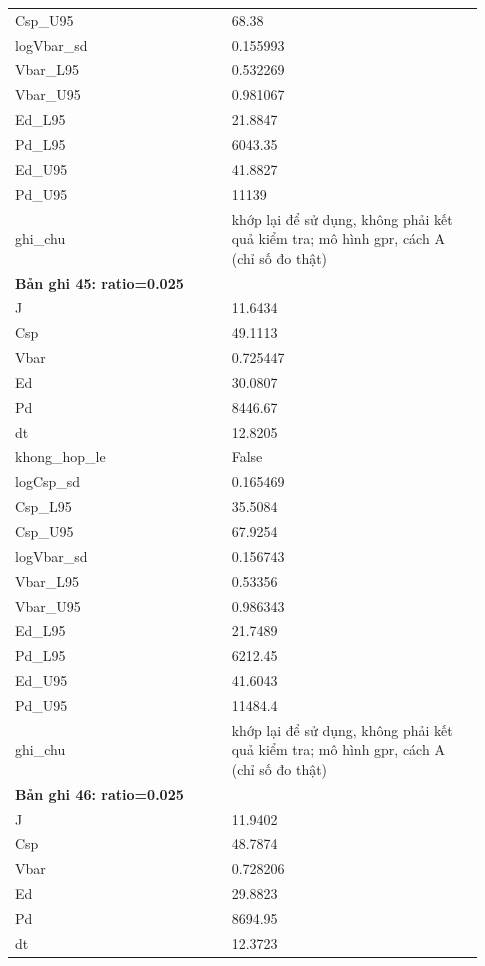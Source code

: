 \begin{longtable}{p{0.43\linewidth}p{0.50\linewidth}}
Csp\_\allowbreak U95 & 68.38 \\
logVbar\_\allowbreak sd & 0.155993 \\
Vbar\_\allowbreak L95 & 0.532269 \\
Vbar\_\allowbreak U95 & 0.981067 \\
Ed\_\allowbreak L95 & 21.8847 \\
Pd\_\allowbreak L95 & 6043.35 \\
Ed\_\allowbreak U95 & 41.8827 \\
Pd\_\allowbreak U95 & 11139 \\
ghi\_\allowbreak chu & khớp lại để sử dụng, không phải kết quả kiểm tra; mô hình gpr, cách A (chỉ số đo thật) \\
\midrule
\multicolumn{2}{p{0.95\linewidth}}{\textbf{Bản ghi 45: ratio=0.025}} \\
J & 11.6434 \\
Csp & 49.1113 \\
Vbar & 0.725447 \\
Ed & 30.0807 \\
Pd & 8446.67 \\
dt & 12.8205 \\
khong\_\allowbreak hop\_\allowbreak le & False \\
logCsp\_\allowbreak sd & 0.165469 \\
Csp\_\allowbreak L95 & 35.5084 \\
Csp\_\allowbreak U95 & 67.9254 \\
logVbar\_\allowbreak sd & 0.156743 \\
Vbar\_\allowbreak L95 & 0.53356 \\
Vbar\_\allowbreak U95 & 0.986343 \\
Ed\_\allowbreak L95 & 21.7489 \\
Pd\_\allowbreak L95 & 6212.45 \\
Ed\_\allowbreak U95 & 41.6043 \\
Pd\_\allowbreak U95 & 11484.4 \\
ghi\_\allowbreak chu & khớp lại để sử dụng, không phải kết quả kiểm tra; mô hình gpr, cách A (chỉ số đo thật) \\
\midrule
\multicolumn{2}{p{0.95\linewidth}}{\textbf{Bản ghi 46: ratio=0.025}} \\
J & 11.9402 \\
Csp & 48.7874 \\
Vbar & 0.728206 \\
Ed & 29.8823 \\
Pd & 8694.95 \\
dt & 12.3723 \\

\end{longtable}
